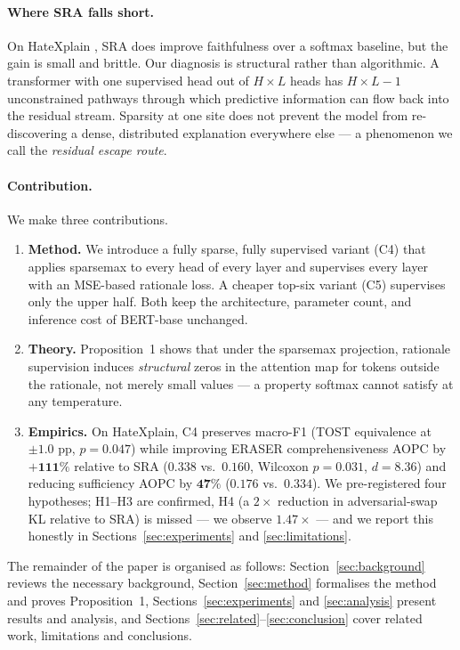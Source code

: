 \documentclass{article}
\begin{document}
\paragraph{Where SRA falls short.} On HateXplain \citep{mathew2021hatexplain}, SRA does
improve faithfulness over a softmax baseline, but the gain is small and brittle. Our
diagnosis is structural rather than algorithmic. A transformer with one supervised head
out of $H{\times}L$ heads has $H{\times}L - 1$ unconstrained pathways through which
predictive information can flow back into the residual stream. Sparsity at one site does
not prevent the model from re-discovering a dense, distributed explanation everywhere
else --- a phenomenon we call the \emph{residual escape route}.

\paragraph{Contribution.} We make three contributions.
\begin{enumerate}
\item \textbf{Method.} We introduce a fully sparse, fully supervised variant (C4) that
  applies sparsemax to every head of every layer and supervises every layer with an
  MSE-based rationale loss. A cheaper top-six variant (C5) supervises only the upper
  half. Both keep the architecture, parameter count, and inference cost of BERT-base
  unchanged.
\item \textbf{Theory.} Proposition~1 shows that under the sparsemax projection,
  rationale supervision induces \emph{structural} zeros in the attention map for tokens
  outside the rationale, not merely small values --- a property softmax cannot satisfy at
  any temperature.
\item \textbf{Empirics.} On HateXplain, C4 preserves macro-F1 (TOST equivalence at
  $\pm 1.0$ pp, $p{=}0.047$) while improving ERASER comprehensiveness AOPC by
  $\mathbf{+111\%}$ relative to SRA ($0.338$ vs.\ $0.160$, Wilcoxon $p{=}0.031$,
  $d{=}8.36$) and reducing sufficiency AOPC by $\mathbf{47\%}$ ($0.176$ vs.\ $0.334$).
  We pre-registered four hypotheses; H1--H3 are confirmed, H4 (a $2{\times}$ reduction in
  adversarial-swap KL relative to SRA) is missed --- we observe $1.47{\times}$ --- and we
  report this honestly in Sections~\ref{sec:experiments} and \ref{sec:limitations}.
\end{enumerate}
The remainder of the paper is organised as follows: Section~\ref{sec:background} reviews
the necessary background, Section~\ref{sec:method} formalises the method and proves
Proposition~1, Sections~\ref{sec:experiments} and \ref{sec:analysis} present results and
analysis, and Sections~\ref{sec:related}--\ref{sec:conclusion} cover related work,
limitations and conclusions.
\end{document}
